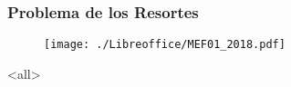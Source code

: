 

\mode*
\begin{frame}[label=FrameNumeracionGL]
  \frametitle<presentation>{Problema de los Resortes}

  \begin{figure}
    \texttt{[image: ./Libreoffice/MEF01\_2018.pdf]}
  \end{figure}


\end{frame}
\mode<all>
